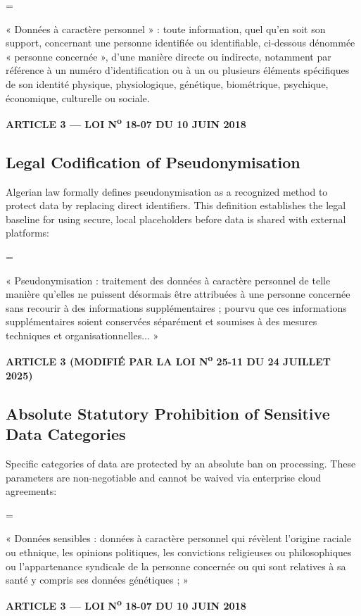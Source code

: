 \documentclass[11pt,a4paper]{article}
\newenvironment{legalquote}{
    \begin{list}{}{
        \leftmargin=0.5in
        \rightmargin=0in
        \topsep=6pt
        \partopsep=0pt
        \parsep=\parskip
    }
    \item[]\itshape
}{
    \end{list}
}
\begin{document}
\begin{legalquote}
    « Données à caractère personnel » : toute information, quel qu'en soit son support, concernant une personne identifiée ou identifiable, ci-dessous dénommée « personne concernée », d'une manière directe ou indirecte, notamment par référence à un numéro d'identification ou à un ou plusieurs éléments spécifiques de son identité physique, physiologique, génétique, biométrique, psychique, économique, culturelle ou sociale.
\end{legalquote}
\hfill {\footnotesize\bfseries ARTICLE 3 — LOI N\textsuperscript{o} 18-07 DU 10 JUIN 2018}

\subsection{Legal Codification of Pseudonymisation}
Algerian law formally defines pseudonymisation as a recognized method to protect data by replacing direct identifiers. This definition establishes the legal baseline for using secure, local placeholders before data is shared with external platforms:
\begin{legalquote}
    « Pseudonymisation : traitement des données à caractère personnel de telle manière qu'elles ne puissent désormais être attribuées à une personne concernée sans recourir à des informations supplémentaires ; pourvu que ces informations supplémentaires soient conservées séparément et soumises à des mesures techniques et organisationnelles... »
\end{legalquote}
\hfill {\footnotesize\bfseries ARTICLE 3 (MODIFIÉ PAR LA LOI N\textsuperscript{o} 25-11 DU 24 JUILLET 2025)}

\subsection{Absolute Statutory Prohibition of Sensitive Data Categories}
Specific categories of data are protected by an absolute ban on processing. These parameters are non-negotiable and cannot be waived via enterprise cloud agreements:

\begin{legalquote}
    « Données sensibles : données à caractère personnel qui révèlent l'origine raciale ou ethnique, les opinions politiques, les convictions religieuses ou philosophiques ou l'appartenance syndicale de la personne concernée ou qui sont relatives à sa santé y compris ses données génétiques ; »
\end{legalquote}
\hfill {\footnotesize\bfseries ARTICLE 3 — LOI N\textsuperscript{o} 18-07 DU 10 JUIN 2018}
\end{document}
